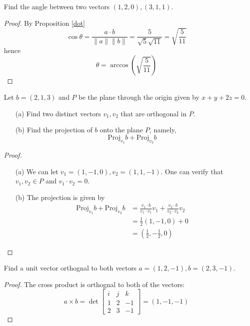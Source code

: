 \documentclass[openany]{book}
\begin{document}
\begin{prob}
    Find the angle between two vectors $(1,2,0), (3,1,1)$.
\end{prob}
\begin{proof}
    By Proposition \ref{dot} 
    \begin{equation*}
        \cos\theta=\frac{a\cdot b}{\|a\|\|b\|}=\frac{5}{\sqrt{5}\sqrt{11}}=\sqrt{\frac{5}{11}}
    \end{equation*}
    hence 
    \begin{equation*}
        \theta=\arccos\left(\sqrt{\frac{5}{11}}\right)
    \end{equation*}
\end{proof}

\begin{prob}
    Let $b=(2,1,3)$ and $P$ be the plane through the origin given by $x+y+2z=0$. 
    \begin{enumerate}
        \item[(a)] Find two distinct vectors $v_1,v_2$ that are orthogonal in $P$.
        \item[(b)] Find the projection of $b$ onto the plane $P$, namely, 
        \begin{equation*}
            \text{Proj}_{v_1}b+\text{Proj}_{v_2}b
        \end{equation*}
    \end{enumerate}
\end{prob}
\begin{proof}
    \begin{enumerate}
        \item[(a)] We can let $v_1=(1,-1,0), v_2=(1,1,-1)$. One can verify that $v_1,v_2\in P$ and $v_1\cdot v_2=0$.
        \item[(b)] The projection is given by
        \begin{align*}
            \text{Proj}_{v_1}b+\text{Proj}_{v_2}b&=\frac{v_1\cdot b}{v_1\cdot v_1}v_1+\frac{v_2\cdot b}{v_2\cdot v_2}v_2\\
            &=\frac{1}{2}(1,-1,0)+0\\
            &=\left(\frac{1}{2}, -\frac{1}{2},0\right)
        \end{align*}
    \end{enumerate}
\end{proof}


\begin{prob}
    Find a unit vector orthognal to both vectors $a=(1,2,-1), b=(2,3,-1)$.
\end{prob}
\begin{proof}
    The cross product is orthognal to both of the vectors:
    \begin{equation*}
        a\times b=\det\begin{bmatrix}
            i&j&k\\
            1&2&-1\\
            2&3&-1
        \end{bmatrix}=(1,-1, -1)
    \end{equation*}
\end{proof}
\end{document}
